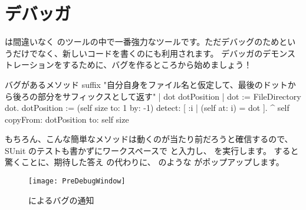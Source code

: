 \documentclass[a4paper,10pt,twoside]{book}
\begin{document}
%

\section{デバッガ}

 は間違いなく \pharo のツールの中で一番強力なツールです。ただデバッグのためというだけでなく、新しいコードを書くのにも利用されます。
デバッガのデモンストレーションをするために、バグを作るところから始めましょう！


\begin{method}[buggy]{バグがあるメソッド}
suffix
"自分自身をファイル名と仮定して、最後のドットから後ろの部分をサフィックスとして返す"
| dot dotPosition |
dot := FileDirectory dot.
dotPosition := (self size to: 1 by: -1) detect: [ :i | (self at: i) = dot ].
^ self copyFrom: dotPosition to: self size
\end{method}

もちろん、こんな簡単なメソッドは動くのが当たり前だろうと確信するので、SUnit のテストも書かずにワークスペースで  と入力し、
 を実行します。
すると驚くことに、期待した答え  の代わりに、  のような  がポップアップします。

\begin{figure}[btp]
\begin{center}
\texttt{[image: PreDebugWindow]}
\end{center}
\caption{  によるバグの通知}
\end{figure}
\end{document}
